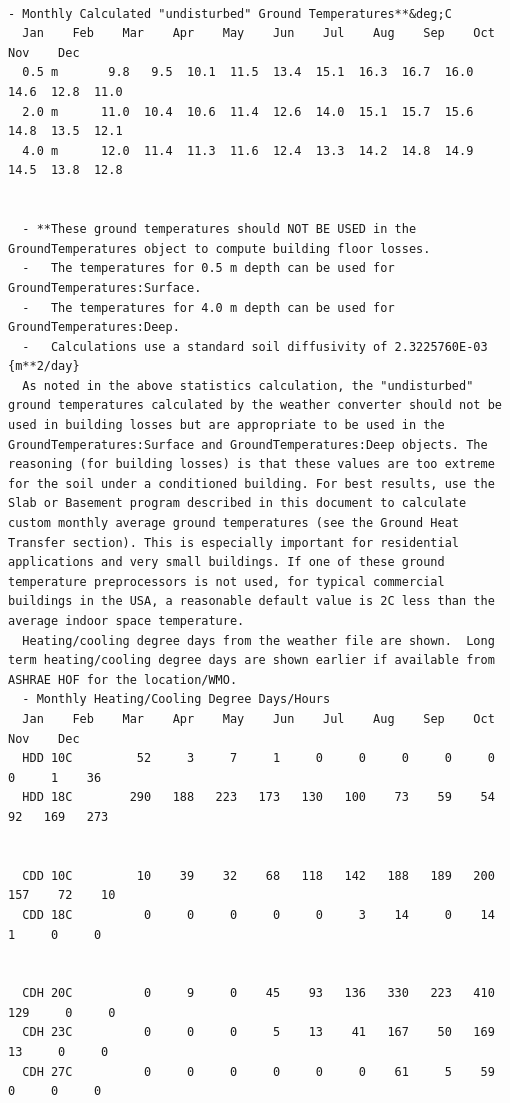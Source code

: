 \begin{lstlisting}

- Monthly Calculated "undisturbed" Ground Temperatures**&deg;C
  Jan    Feb    Mar    Apr    May    Jun    Jul    Aug    Sep    Oct    Nov    Dec
  0.5 m       9.8   9.5  10.1  11.5  13.4  15.1  16.3  16.7  16.0  14.6  12.8  11.0
  2.0 m      11.0  10.4  10.6  11.4  12.6  14.0  15.1  15.7  15.6  14.8  13.5  12.1
  4.0 m      12.0  11.4  11.3  11.6  12.4  13.3  14.2  14.8  14.9  14.5  13.8  12.8


  - **These ground temperatures should NOT BE USED in the GroundTemperatures object to compute building floor losses.
  -   The temperatures for 0.5 m depth can be used for GroundTemperatures:Surface.
  -   The temperatures for 4.0 m depth can be used for GroundTemperatures:Deep.
  -   Calculations use a standard soil diffusivity of 2.3225760E-03 {m**2/day}
  As noted in the above statistics calculation, the "undisturbed" ground temperatures calculated by the weather converter should not be used in building losses but are appropriate to be used in the GroundTemperatures:Surface and GroundTemperatures:Deep objects. The reasoning (for building losses) is that these values are too extreme for the soil under a conditioned building. For best results, use the Slab or Basement program described in this document to calculate custom monthly average ground temperatures (see the Ground Heat Transfer section). This is especially important for residential applications and very small buildings. If one of these ground temperature preprocessors is not used, for typical commercial buildings in the USA, a reasonable default value is 2C less than the average indoor space temperature.
  Heating/cooling degree days from the weather file are shown.  Long term heating/cooling degree days are shown earlier if available from ASHRAE HOF for the location/WMO.
  - Monthly Heating/Cooling Degree Days/Hours
  Jan    Feb    Mar    Apr    May    Jun    Jul    Aug    Sep    Oct    Nov    Dec
  HDD 10C         52     3     7     1     0     0     0     0     0     0     1    36
  HDD 18C        290   188   223   173   130   100    73    59    54    92   169   273


  CDD 10C         10    39    32    68   118   142   188   189   200   157    72    10
  CDD 18C          0     0     0     0     0     3    14     0    14     1     0     0


  CDH 20C          0     9     0    45    93   136   330   223   410   129     0     0
  CDH 23C          0     0     0     5    13    41   167    50   169    13     0     0
  CDH 27C          0     0     0     0     0     0    61     5    59     0     0     0



\end{lstlisting}
